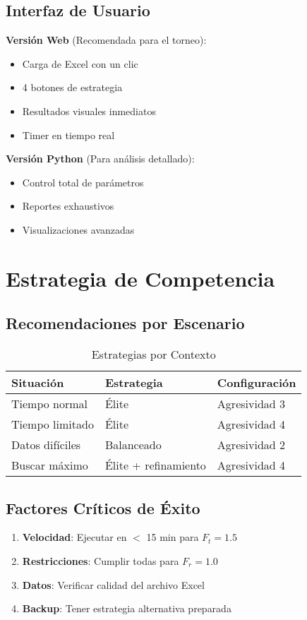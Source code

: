 \documentclass[11pt,a4paper]{article}
\begin{document}
	\subsection{Interfaz de Usuario}
	
	\textbf{Versión Web} (Recomendada para el torneo):
	\begin{itemize}
		\item Carga de Excel con un clic
		\item 4 botones de estrategia
		\item Resultados visuales inmediatos
		\item Timer en tiempo real
	\end{itemize}
	
	\textbf{Versión Python} (Para análisis detallado):
	\begin{itemize}
		\item Control total de parámetros
		\item Reportes exhaustivos
		\item Visualizaciones avanzadas
	\end{itemize}
	
	\section{Estrategia de Competencia}
	
	\subsection{Recomendaciones por Escenario}
	\begin{table}[H]
		\centering
		\begin{tabular}{@{}lll@{}}
			\toprule
			\textbf{Situación} & \textbf{Estrategia} & \textbf{Configuración} \\
			\midrule
			Tiempo normal & Élite & Agresividad 3 \\
			Tiempo limitado & Élite & Agresividad 4 \\
			Datos difíciles & Balanceado & Agresividad 2 \\
			Buscar máximo & Élite + refinamiento & Agresividad 4 \\
			\bottomrule
		\end{tabular}
		\caption{Estrategias por Contexto}
	\end{table}
	
	\subsection{Factores Críticos de Éxito}
	\begin{enumerate}
		\item \textbf{Velocidad}: Ejecutar en $<$ 15 min para $F_t = 1.5$
		\item \textbf{Restricciones}: Cumplir todas para $F_r = 1.0$
		\item \textbf{Datos}: Verificar calidad del archivo Excel
		\item \textbf{Backup}: Tener estrategia alternativa preparada
	\end{enumerate}
	
\end{document}
